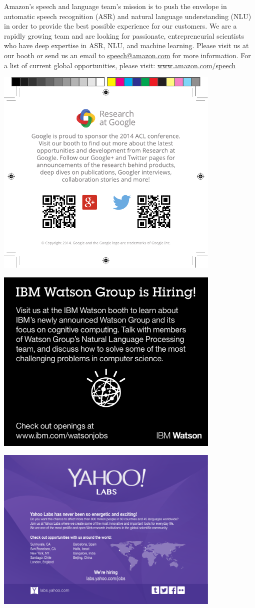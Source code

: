 Amazon’s speech and language team’s mission is to push the envelope in
automatic speech recognition (ASR) and natural language understanding
(NLU) in order to provide the best possible experience for our
customers. We are a rapidly growing team and are looking for
passionate, entrepreneurial scientists who have deep expertise in ASR,
NLU, and machine learning.  Please visit us at our booth or send us an
email to \url{speech@amazon.com} for more information.  For a list of
current global opportunities, please visit: \url{www.amazon.com/speech}

\vfill

\includegraphics[width=4.25in]{content/ads/gold/Google-Ad.pdf}

\newpage
\thispagestyle{empty}

\includegraphics[width=4.25in]{content/ads/gold/Watson.pdf}

\vfill

\includegraphics[width=4.25in]{content/ads/gold/Yahoo-Ad.pdf}
